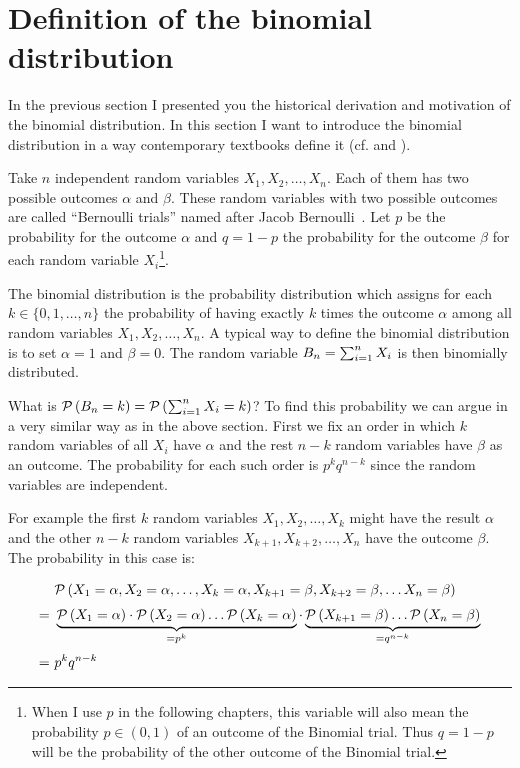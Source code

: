 \section{Definition of the binomial distribution}

In the previous section I presented you the historical derivation and motivation of the binomial distribution. In this section I want to introduce the binomial distribution in a way contemporary textbooks define it (cf. \cite[p. 33]{georgii} and \cite[pp. 57-58]{irle}).

Take $n$ independent random variables $X_1, X_2, \ldots, X_n$. Each of them has two possible outcomes $\alpha$ and $\beta$. These random variables with two possible outcomes are called ``Bernoulli trials'' named after Jacob Bernoulli~\cite[p. 45]{uspensky}\cite{wiki:bernoulli_distribution}. Let $p$ be the probability for the outcome $\alpha$ and $q=1-p$ the probability for the outcome $\beta$ for each random variable $X_i$\footnote{When I use $p$ in the following chapters, this variable will also mean the probability $p\in(0,1)$ of an outcome of the Binomial trial. Thus $q=1-p$ will be the probability of the other outcome of the Binomial trial.}.

The binomial distribution is the probability distribution which assigns for each $k\in \{0,1,\ldots,n\}$ the probability of having exactly $k$ times the outcome $\alpha$ among all random variables $X_1,X_2,\ldots,X_n$. A typical way to define the binomial distribution is to set $\alpha=1$ and $\beta=0$. The random variable $B_{n}=\sum_{i=1}^n X_i$ is then binomially distributed.

What is $\mathcal P\left({B_{n} = k}\right) = \mathcal P\left({\sum_{i=1}^n X_i=k}\right)$? To find this probability we can argue in a very similar way as in the above section. First we fix an order in which $k$ random variables of all $X_i$ have $\alpha$ and the rest $n-k$ random variables have $\beta$ as an outcome. The probability for each such order is $p^kq^{n-k}$ since the random variables are independent.

For example the first $k$ random variables $X_1,X_2,\ldots,X_k$ might have the result $\alpha$ and the other $n-k$ random variables $X_{k+1},X_{k+2},\ldots,X_n$ have the outcome $\beta$. The probability in this case is:

\begin{align}
  & \P{X_1=\alpha, X_2=\alpha, \ldots, X_k=\alpha,X_{k+1}=\beta, X_{k+2}=\beta, \ldots X_n =\beta} \nl
  =\ & \underbrace{\P{X_1=\alpha} \cdot \P{ X_2=\alpha} \ldots \P{X_k=\alpha}}_{=p^k} \cdot \underbrace{\P{X_{k+1}=\beta} \ldots \P{X_n =\beta}}_{= q^{n-k}} \nl
  =\ & p^kq^{n-k}
\end{align}


